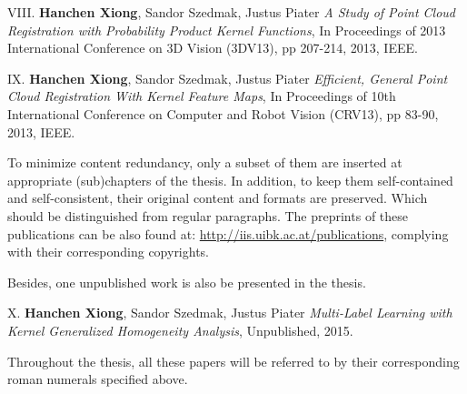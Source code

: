 \begin{shaded}
  {\Huge VIII.} \textbf{Hanchen Xiong}, Sandor Szedmak, Justus Piater {\it A Study of Point Cloud Registration with Probability Product Kernel Functions}, 
In Proceedings of 2013 International Conference on 3D Vision (3DV13), pp 207-214,  2013, IEEE.
\vspace{-.2cm}

 {\Huge IX.} \textbf{Hanchen Xiong}, Sandor Szedmak, Justus Piater {\it Efficient, General Point Cloud Registration With Kernel Feature Maps}, 
In Proceedings of 10th International Conference on Computer and Robot Vision (CRV13), pp 83-90, 2013, IEEE.

\vspace{-.2cm}
\end{shaded}
To minimize content redundancy, only a subset of them are inserted at appropriate (sub)chapters of the thesis. In addition, to keep them self-contained and self-consistent,     
their original content and formats are preserved.   
Which should be distinguished from regular paragraphs. The preprints of these publications can be also found at: \url{http://iis.uibk.ac.at/publications}, complying with their corresponding copyrights. 

Besides, one unpublished work is also be presented in the thesis.   
\begin{shaded}
 {\Huge X.} \textbf{Hanchen Xiong}, Sandor Szedmak, Justus Piater {\it Multi-Label Learning with Kernel Generalized Homogeneity Analysis}, 
Unpublished, 2015.
\end{shaded}
Throughout the thesis, all these papers will be referred to by their corresponding roman numerals specified above.    
